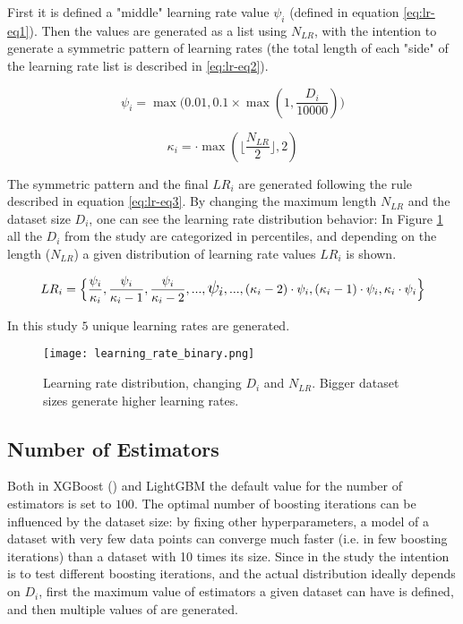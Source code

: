 First it is defined a "middle" learning rate value $\psi_i$ (defined in equation \ref{eq:lr-eq1}). Then the values are generated as a list using $N_{LR}$, with the intention to generate a symmetric pattern of learning rates (the total length of each "side" of the learning rate list is described in \ref{eq:lr-eq2}).

\begin{equation}
    \psi_i = \max\Big(0.01, 0.1 \times \max(1, \frac{D_i}{10000})\Big)
    \label{eq:lr-eq1}
\end{equation}

\begin{equation}
    \kappa_i = \cdot \max\left(\lfloor\frac{N_{LR}}{2}\rfloor, 2\right)
    \label{eq:lr-eq2}
\end{equation}

The symmetric pattern and the final $LR_i$ are generated following the rule described in equation \ref{eq:lr-eq3}. By changing the maximum length $N_{LR}$ and the dataset size $D_i$, one can see the learning rate distribution behavior: In Figure \ref{fig:hyperparam-lr1} all the $D_i$ from the study are categorized in percentiles, and depending on the length ($N_{LR}$) a given distribution of learning rate values $LR_i$ is shown.

\begin{equation}
    LR_i = \Big\{\frac{\psi_i}{\kappa_i}, \frac{\psi_i}{\kappa_i - 1}, \frac{\psi_i}{\kappa_i - 2}, ..., \text{\Large $\psi_i$}, ..., (\kappa_i - 2)\cdot\psi_i, (\kappa_i - 1)\cdot\psi_i, \kappa_i\cdot\psi_i\Big\}
    \label{eq:lr-eq3}
\end{equation}

In this study $5$ unique learning rates are generated.

\begin{figure}[!h]
    \centering
    \texttt{[image: learning\_rate\_binary.png]} 
    \caption{Learning rate distribution, changing $D_i$ and $N_{LR}$. Bigger dataset sizes generate higher learning rates.}
    \label{fig:hyperparam-lr1}
\end{figure}

\subsection{Number of Estimators}
\label{subsec:hp-space-num-est}

Both in XGBoost () and LightGBM the default value for the number of estimators is set to $100$. The optimal number of boosting iterations can be influenced by the dataset size: by fixing other hyperparameters, a model of a dataset with very few data points can converge much faster (i.e. in few boosting iterations) than a dataset with 10 times its size. Since in the study the intention is to test different boosting iterations, and the actual distribution ideally depends on $D_i$, first the maximum value of estimators a given dataset can have is defined, and then  multiple values of  are generated. 

